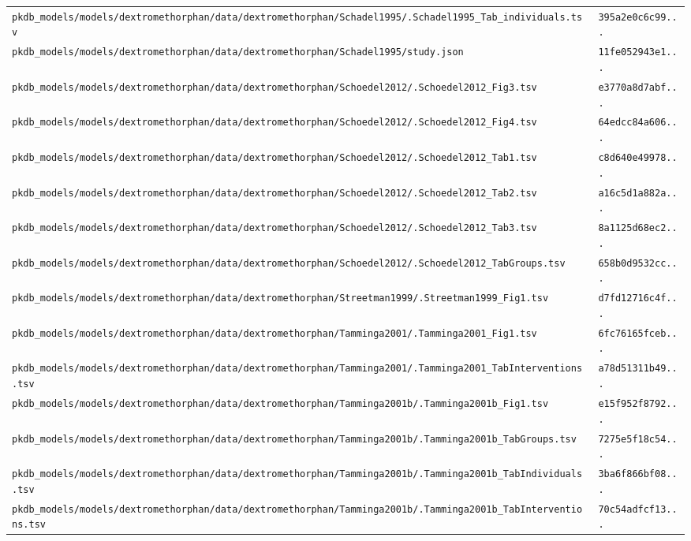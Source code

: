 \documentclass{article}
\begin{document}
\begin{longtable}{ll}
\texttt{pkdb\_models/models/dextromethorphan/data/dextromethorphan/Schadel1995/.Schadel1995\_Tab\_individuals.tsv} & \texttt{395a2e0c6c99...} \\
\texttt{pkdb\_models/models/dextromethorphan/data/dextromethorphan/Schadel1995/study.json} & \texttt{11fe052943e1...} \\
\texttt{pkdb\_models/models/dextromethorphan/data/dextromethorphan/Schoedel2012/.Schoedel2012\_Fig3.tsv} & \texttt{e3770a8d7abf...} \\
\texttt{pkdb\_models/models/dextromethorphan/data/dextromethorphan/Schoedel2012/.Schoedel2012\_Fig4.tsv} & \texttt{64edcc84a606...} \\
\texttt{pkdb\_models/models/dextromethorphan/data/dextromethorphan/Schoedel2012/.Schoedel2012\_Tab1.tsv} & \texttt{c8d640e49978...} \\
\texttt{pkdb\_models/models/dextromethorphan/data/dextromethorphan/Schoedel2012/.Schoedel2012\_Tab2.tsv} & \texttt{a16c5d1a882a...} \\
\texttt{pkdb\_models/models/dextromethorphan/data/dextromethorphan/Schoedel2012/.Schoedel2012\_Tab3.tsv} & \texttt{8a1125d68ec2...} \\
\texttt{pkdb\_models/models/dextromethorphan/data/dextromethorphan/Schoedel2012/.Schoedel2012\_TabGroups.tsv} & \texttt{658b0d9532cc...} \\
\texttt{pkdb\_models/models/dextromethorphan/data/dextromethorphan/Streetman1999/.Streetman1999\_Fig1.tsv} & \texttt{d7fd12716c4f...} \\
\texttt{pkdb\_models/models/dextromethorphan/data/dextromethorphan/Tamminga2001/.Tamminga2001\_Fig1.tsv} & \texttt{6fc76165fceb...} \\
\texttt{pkdb\_models/models/dextromethorphan/data/dextromethorphan/Tamminga2001/.Tamminga2001\_TabInterventions.tsv} & \texttt{a78d51311b49...} \\
\texttt{pkdb\_models/models/dextromethorphan/data/dextromethorphan/Tamminga2001b/.Tamminga2001b\_Fig1.tsv} & \texttt{e15f952f8792...} \\
\texttt{pkdb\_models/models/dextromethorphan/data/dextromethorphan/Tamminga2001b/.Tamminga2001b\_TabGroups.tsv} & \texttt{7275e5f18c54...} \\
\texttt{pkdb\_models/models/dextromethorphan/data/dextromethorphan/Tamminga2001b/.Tamminga2001b\_TabIndividuals.tsv} & \texttt{3ba6f866bf08...} \\
\texttt{pkdb\_models/models/dextromethorphan/data/dextromethorphan/Tamminga2001b/.Tamminga2001b\_TabInterventions.tsv} & \texttt{70c54adfcf13...} \\

\end{longtable}
\end{document}
